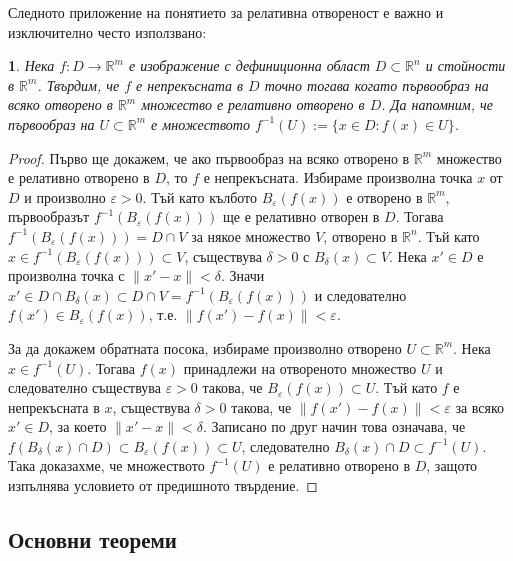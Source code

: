 \documentclass[11pt]{article}
\numberwithin{equation}{section}
\numberwithin{figure}{section}
\numberwithin{table}{section}
\theoremstyle{plain}
\theoremstyle{definition}
\theoremstyle{remark}
\theoremstyle{definition}
\theoremstyle{remark}
\theoremstyle{plain}
\theoremstyle{definition}
\theoremstyle{definition}
\theoremstyle{plain}
\theoremstyle{plain}
\newtheorem{prop}[thm]{\protect\propositionname}
\theoremstyle{plain}
\theoremstyle{definition}
\theoremstyle{plain}
\providecommand{\propositionname}{Твърдение}
\newcommand*{\R}{\mathbb{R}}
\begin{document}
Следното приложение на понятието за релативна отвореност е важно и изключително често използвано:
\begin{prop}
Нека $f: D \longrightarrow \R^m$ е изображение с дефиниционна област $D\subset \R^n$ и стойности в $\R^m$. Твърдим, че $f$ е непрекъсната в $D$ точно тогава когато първообраз на всяко отворено в $\R^m$ множество е релативно отворено в $D$. Да напомним, че първообраз на $U\subset \R^m$ е множеството
$f^{-1} (U) := \{x\in D: f(x) \in U\}$.
\end{prop}
\begin{proof}
Първо ще докажем, че ако първообраз на всяко отворено в $\R^m$ множество е релативно отворено в $D$, то $f$ е непрекъсната.
Избираме произволна точка $x$ от $D$ и произволно $\varepsilon >0$. Тъй като кълбото $B_{\varepsilon}(f(x))$ е отворено в $\R^m$, първообразът $f^{-1} (B_{\varepsilon}(f(x)))$ ще е релативно отворен в $D$. Тогава $f^{-1} (B_{\varepsilon}(f(x)))= D \cap V$ за някое множество $V$, отворено в $\R^n$. Тъй като $x\in f^{-1} (B_{\varepsilon}(f(x)))\subset  V$, съществува $\delta >0$ с $B_\delta (x) \subset V$. Нека $x'\in D$ е произволна точка с $\| x' -x\| <\delta$. Значи $x' \in D \cap B_\delta(x) \subset D\cap V=f^{-1} (B_{\varepsilon}(f(x)))$ и следователно $f(x')\in B_{\varepsilon}(f(x))$, т.е. $\| f(x')-f(x)\| <\varepsilon$.

За да докажем обратната посока, избираме произволно отворено $U\subset \R^m$.
Нека $x\in f^{-1} (U)$. Тогава $f(x)$ принадлежи на отвореното множество $U$ и следователно съществува $\varepsilon >0$ такова, че $B_\varepsilon(f(x)) \subset U$. Тъй като $f$ е непрекъсната в $x$, съществува $\delta >0$ такова, че $\| f(x')-f(x)\| <\varepsilon$ за всяко $x'\in D$, за което $\| x'-x\| <\delta$. Записано по друг начин това означава, че $f(B_{\delta}(x)\cap D) \subset B_\varepsilon (f(x)) \subset U$, следователно $B_{\delta}(x)\cap D \subset f^{-1} (U)$. Така доказахме, че множеството $f^{-1} (U)$ е релативно отворено в $D$, защото изпълнява условието от предишното твърдение.
\end{proof}

\subsection{Основни теореми}
\end{document}
